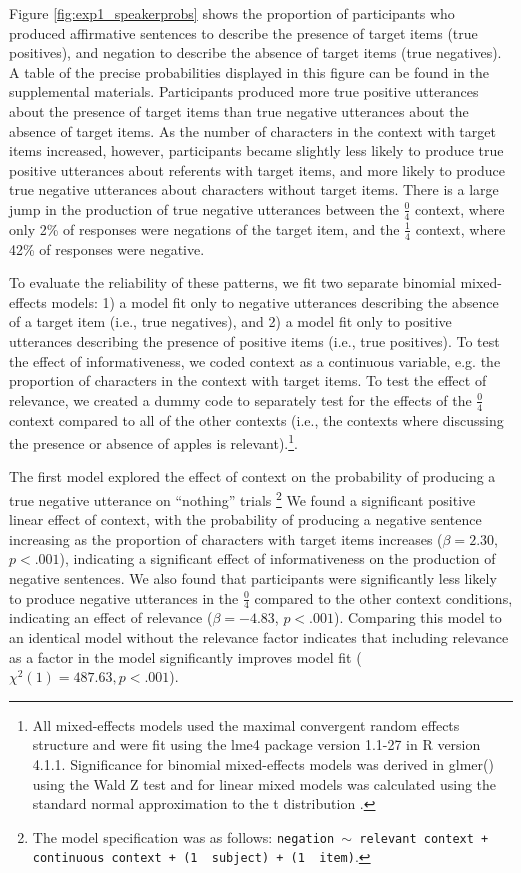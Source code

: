 \documentclass[man, floatsintext, noapacite]{apa6}
\begin{document}
Figure \ref{fig:exp1_speakerprobs} shows the proportion of participants who produced affirmative sentences to describe the presence of target items (true positives), and negation to describe the absence of target items (true negatives). A table of the precise probabilities displayed in this figure can be found in the supplemental materials. Participants produced more true positive utterances about the presence of target items than true negative utterances about the absence of target items. As the number of characters in the context with target items increased, however, participants became slightly less likely to produce true positive utterances about referents with target items, and more likely to produce true negative utterances about characters without target items. There is a large jump in the production of true negative utterances between the $\frac{0}{4}$ context, where only 2\% of responses were negations of the target item, and the $\frac{1}{4}$ context, where 42\% of responses were negative. 

To evaluate the reliability of these patterns, we fit two separate binomial mixed-effects models: 1) a model fit only to negative utterances describing the absence of a target item (i.e., true negatives), and 2) a model fit only to positive utterances describing the presence of positive items (i.e., true positives). To test the effect of informativeness, we coded context as a continuous variable, e.g. the proportion of characters in the context with target items. To test the effect of relevance, we created a dummy code to separately test for the effects of the  $\frac{0}{4}$ context compared to all of the other contexts (i.e., the contexts where discussing the presence or absence of apples is relevant).\footnote{All mixed-effects models used the maximal convergent random effects structure \cite{barr2013} and were fit using the lme4 package version 1.1-27 in R version 4.1.1. Significance for binomial mixed-effects models was derived in glmer() using the Wald Z test and for linear mixed models was calculated using the standard normal approximation to the t distribution \cite{barr2013}.}.

The first model explored the effect of context on the probability of producing a true negative utterance on ``nothing'' trials \footnote{The model specification was as follows: \texttt{negation $\sim$  relevant context + continuous context + (1~\textbar~subject) +  (1~\textbar~item)}.} We found a significant positive linear effect of context, with the probability of producing a negative sentence increasing as the proportion of characters with target items increases ($\beta= 2.30$, $p< .001$), indicating a significant effect of informativeness on the production of negative sentences. We also found that participants were significantly less likely to produce negative utterances in the $\frac{0}{4}$ compared to the other context conditions, indicating an effect of relevance ($\beta= -4.83$, $p< .001$). Comparing this model to an identical model without the relevance factor indicates that including relevance as a factor in the model significantly improves model fit ($\chi^2(1)= 487.63, p < .001$). 
\end{document}
